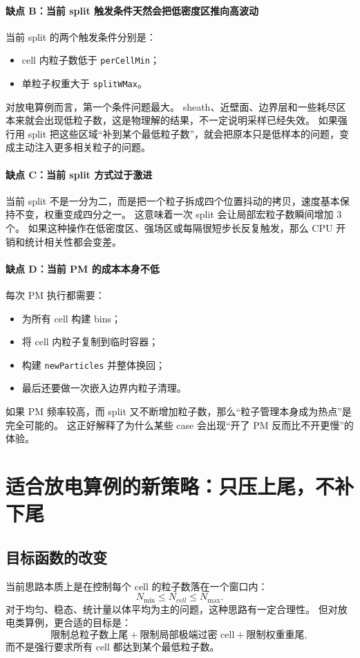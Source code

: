 \documentclass[UTF8,11pt,a4paper]{ctexart}
\begin{document}
\paragraph{缺点 B：当前 split 触发条件天然会把低密度区推向高波动}
当前 split 的两个触发条件分别是：
\begin{itemize}[itemsep=2pt]
  \item cell 内粒子数低于 \texttt{perCellMin}；
  \item 单粒子权重大于 \texttt{splitWMax}。
\end{itemize}
对放电算例而言，第一个条件问题最大。
sheath、近壁面、边界层和一些耗尽区本来就会出现低粒子数，这是物理解的结果，不一定说明采样已经失效。
如果强行用 split 把这些区域“补到某个最低粒子数”，就会把原本只是低样本的问题，变成主动注入更多相关粒子的问题。

\paragraph{缺点 C：当前 split 方式过于激进}
当前 split 不是一分为二，而是把一个粒子拆成四个位置抖动的拷贝，速度基本保持不变，权重变成四分之一。
这意味着一次 split 会让局部宏粒子数瞬间增加 3 个。
如果这种操作在低密度区、强场区或每隔很短步长反复触发，那么 CPU 开销和统计相关性都会变差。

\paragraph{缺点 D：当前 PM 的成本本身不低}
每次 PM 执行都需要：
\begin{itemize}[itemsep=2pt]
  \item 为所有 cell 构建 bins；
  \item 将 cell 内粒子复制到临时容器；
  \item 构建 \texttt{newParticles} 并整体换回；
  \item 最后还要做一次嵌入边界内粒子清理。
\end{itemize}
如果 PM 频率较高，而 split 又不断增加粒子数，那么“粒子管理本身成为热点”是完全可能的。
这正好解释了为什么某些 case 会出现“开了 PM 反而比不开更慢”的体验。

\section{适合放电算例的新策略：只压上尾，不补下尾}

\subsection{目标函数的改变}
当前思路本质上是在控制每个 cell 的粒子数落在一个窗口内：
\[
N_{\min} \le N_{cell} \le N_{\max}.
\]
对于均匀、稳态、统计量以体平均为主的问题，这种思路有一定合理性。
但对放电类算例，更合适的目标是：
\[
\text{限制总粒子数上尾} + \text{限制局部极端过密 cell} + \text{限制权重重尾},
\]
而不是强行要求所有 cell 都达到某个最低粒子数。
\end{document}
